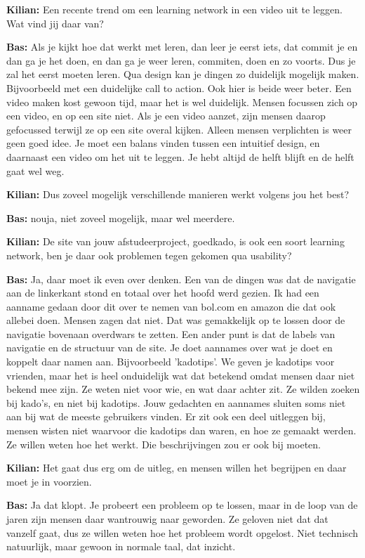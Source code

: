 \textbf{Kilian:} Een recente trend om een learning network in een video uit te leggen. Wat vind jij daar van?

\textbf{Bas:} Als je kijkt hoe dat werkt met leren, dan leer je eerst iets, dat commit je en dan ga je het doen, en dan ga je weer leren, commiten, doen en zo voorts. Dus je zal het eerst moeten leren. Qua design kan je dingen zo duidelijk mogelijk maken. Bijvoorbeeld met een duidelijke call to action. Ook hier is beide weer beter. Een video maken kost gewoon tijd, maar het is wel duidelijk. Mensen focussen zich op een video, en op een site niet. Als je een video aanzet, zijn mensen daarop gefocussed terwijl ze op een site overal kijken. Alleen mensen verplichten is weer geen goed idee. Je moet een balans vinden tussen een intuitief design, en daarnaast een video om het uit te leggen. Je hebt altijd de helft blijft en de helft gaat wel weg.

\textbf{Kilian:} Dus zoveel mogelijk verschillende manieren werkt volgens jou het best?

\textbf{Bas:} nouja, niet zoveel mogelijk, maar wel meerdere.

\textbf{Kilian:} De site van jouw afstudeerproject, goedkado, is ook een soort learning network, ben je daar ook problemen tegen gekomen qua usability?

\textbf{Bas:} Ja, daar moet ik even over denken. Een van de dingen was dat de navigatie aan de linkerkant stond en totaal over het hoofd werd gezien. Ik had een aanname gedaan door dit over te nemen van bol.com en amazon die dat ook allebei doen. Mensen zagen dat niet. Dat was gemakkelijk op te lossen door de navigatie bovenaan overdwars te zetten. Een ander punt is dat de labels van navigatie en de structuur van de site. Je doet aannames over wat je doet en koppelt daar namen aan. Bijvoorbeeld 'kadotips'. We geven je kadotips voor vrienden, maar het is heel onduidelijk wat dat betekend omdat mensen daar niet bekend mee zijn. Ze weten niet voor wie, en wat daar achter zit. Ze wilden zoeken bij kado's, en niet bij kadotips. Jouw gedachten en aannames sluiten soms niet aan bij wat de meeste gebruikers vinden. Er zit ook een deel uitleggen bij, mensen wisten niet waarvoor die kadotips dan waren, en hoe ze gemaakt werden. Ze willen weten hoe het werkt. Die beschrijvingen zou er ook bij moeten.

\textbf{Kilian:} Het gaat dus erg om de uitleg, en mensen willen het begrijpen en daar moet je in voorzien.

\textbf{Bas:} Ja dat klopt. Je probeert een probleem op te lossen, maar in de loop van de jaren zijn mensen daar wantrouwig naar geworden. Ze geloven niet dat dat vanzelf gaat, dus ze willen weten hoe het probleem wordt opgelost. Niet technisch natuurlijk, maar gewoon in normale taal, dat inzicht.

